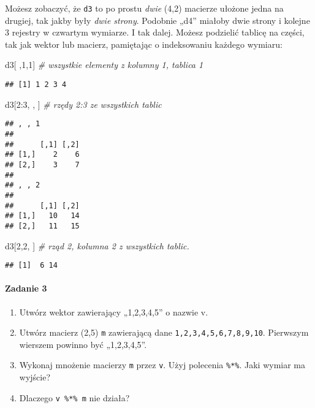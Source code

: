 \documentclass[
]{article}
\newenvironment{Shaded}{\begin{snugshade}}{\end{snugshade}}
\newcommand{\CommentTok}[1]{\textcolor[rgb]{0.56,0.35,0.01}{\textit{#1}}}
\newcommand{\DecValTok}[1]{\textcolor[rgb]{0.00,0.00,0.81}{#1}}
\newcommand{\NormalTok}[1]{#1}
\newcommand{\SpecialCharTok}[1]{\textcolor[rgb]{0.00,0.00,0.00}{#1}}
\providecommand{\tightlist}{%
  \setlength{\itemsep}{0pt}\setlength{\parskip}{0pt}}
\begin{document}
Możesz zobaczyć, że \texttt{d3} to po prostu \emph{dwie} (4,2) macierze
ułożone jedna na drugiej, tak jakby były \emph{dwie strony}. Podobnie
„d4'' miałoby dwie strony i kolejne 3 rejestry w czwartym wymiarze. I
tak dalej. Możesz podzielić tablicę na części, tak jak wektor lub
macierz, pamiętając o indeksowaniu każdego wymiaru:

\begin{Shaded}
\begin{Highlighting}[]
\NormalTok{d3[ ,}\DecValTok{1}\NormalTok{,}\DecValTok{1}\NormalTok{]  }\CommentTok{\# wszystkie elementy z kolumny 1, tablica 1}
\end{Highlighting}
\end{Shaded}

\begin{verbatim}
## [1] 1 2 3 4
\end{verbatim}

\begin{Shaded}
\begin{Highlighting}[]
\NormalTok{d3[}\DecValTok{2}\SpecialCharTok{:}\DecValTok{3}\NormalTok{, , ]  }\CommentTok{\# rzędy 2:3 ze wszystkich tablic}
\end{Highlighting}
\end{Shaded}

\begin{verbatim}
## , , 1
## 
##      [,1] [,2]
## [1,]    2    6
## [2,]    3    7
## 
## , , 2
## 
##      [,1] [,2]
## [1,]   10   14
## [2,]   11   15
\end{verbatim}

\begin{Shaded}
\begin{Highlighting}[]
\NormalTok{d3[}\DecValTok{2}\NormalTok{,}\DecValTok{2}\NormalTok{, ]  }\CommentTok{\# rząd 2, kolumna 2 z wszystkich tablic.}
\end{Highlighting}
\end{Shaded}

\begin{verbatim}
## [1]  6 14
\end{verbatim}

\hypertarget{zadanie-3}{%
\paragraph{Zadanie 3}\label{zadanie-3}}

\begin{enumerate}
\def\labelenumi{\arabic{enumi}.}
\tightlist
\item
  Utwórz wektor zawierający „1,2,3,4,5'' o nazwie v.
\item
  Utwórz macierz (2,5) \texttt{m} zawierającą dane
  \texttt{1,2,3,4,5,6,7,8,9,10}. Pierwszym wierszem powinno być
  „1,2,3,4,5''.
\item
  Wykonaj mnożenie macierzy \texttt{m} przez \texttt{v}. Użyj polecenia
  \texttt{\%*\%}. Jaki wymiar ma wyjście?
\item
  Dlaczego \texttt{v\ \%*\%\ m} nie działa?
\end{enumerate}
\end{document}
